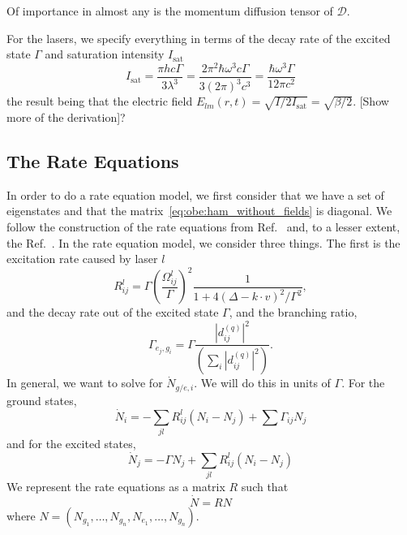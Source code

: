 \documentclass[final,5p,times,twocolumn]{elsarticle}
\begin{document}
Of importance in almost any is the momentum diffusion tensor of $\mathcal{D}$.

For the lasers, we specify everything in terms of the decay rate of the excited state $\Gamma$ and saturation intensity $I_\text{sat}$
\begin{equation}
    I_\text{sat} = \frac{\pi h c \Gamma}{3\lambda^3} = \frac{2\pi^2 \hbar \omega^3 c \Gamma}{3(2\pi)^3 c^3} = \frac{\hbar \omega^3 \Gamma}{12 \pi c^2}
\end{equation}
the result being that the electric field $E_{lm}(r,t) = \sqrt{I/2I_\text{sat}} = \sqrt{\beta/2}$.  [Show more of the derivation]?

\subsection{The Rate Equations}
In order to do a rate equation model, we first consider that we have a set of
eigenstates and that the matrix~\ref{eq:obe:ham_without_fields} is diagonal.  We
follow the construction of the rate equations from Ref.~\cite{Tarbutt2015} and,
to a lesser extent, the Ref.~\cite{Tollett1995}.
In the rate equation model, we consider three things.  The first is the
excitation rate caused by laser $l$
\begin{equation}
    \label{eq:lcp:scattering_rate}
    R^l_{ij} = \Gamma \left(\frac{\Omega^l_{ij}}{\Gamma}\right)^2\frac{1}{1 + 4(\Delta - k\cdot v)^2/\Gamma^2},
\end{equation}
and the decay rate out of the excited state $\Gamma$, and the branching ratio,
\begin{equation}
    \Gamma_{e_j,g_i} = \Gamma \frac{\left|d^{(q)}_{ij}\right|^2}{\left(\sum_i \left|d^{(q)}_{ij}\right|^2\right)}.
\end{equation}
In general, we want to solve for $\dot{N}_{g/e,i}$.  We will do this in units of
$\Gamma$.  For the ground states,
\begin{equation}
    \dot{N}_i = -\sum_{jl} R^l_{ij} (N_i - N_j) + \sum \Gamma_{ij}N_j
\end{equation}
and for the excited states,
\begin{equation}
    \dot{N}_j = - \Gamma N_j + \sum_{jl} R^l_{ij} (N_i - N_j)
\end{equation}
We represent the rate equations as a matrix $R$ such that
\begin{equation}
    \dot{N} = R N
\end{equation}
where $N = (N_{g_1},\dots, N_{g_n}, N_{e_1}, \dots, N_{g_n})$.
\end{document}
